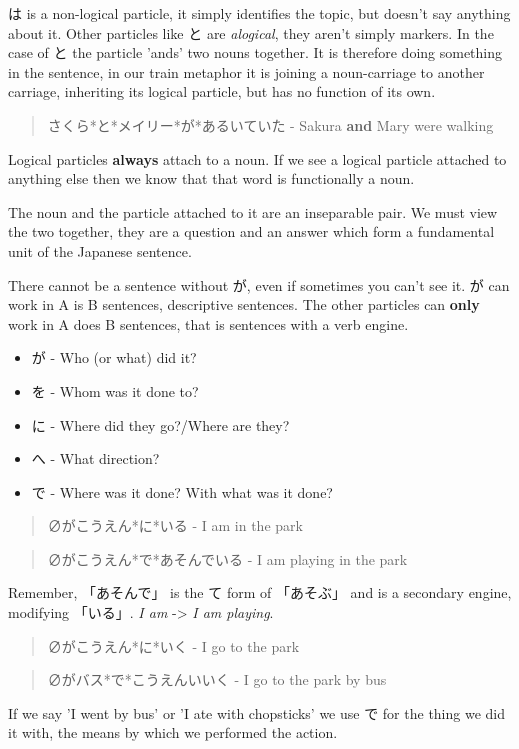 \documentclass[11pt]{article}
\begin{document}
は is a non-logical particle, it simply identifies the topic, but doesn't say anything about it. Other particles like と are \emph{alogical}, they aren't simply markers. In the case of と the particle 'ands' two nouns together. It is therefore doing something in the sentence, in our train metaphor it is joining a noun-carriage to another carriage, inheriting its logical particle, but has no function of its own.
\begin{quote}
さくら*と*メイリー*が*あるいていた - Sakura \textbf{and} Mary were walking
\end{quote}

Logical particles \textbf{always} attach to a noun. If we see a logical particle attached to anything else then we know that that word is functionally a noun.

The noun and the particle attached to it are an inseparable pair. We must view the two together, they are a question and an answer which form a fundamental unit of the Japanese sentence.

There cannot be a sentence without が, even if sometimes you can't see it. が can work in A is B sentences, descriptive sentences. The other particles can \textbf{only} work in A does B sentences, that is sentences with a verb engine.
\begin{itemize}
\item が - Who (or what) did it?
\item を - Whom was it done to?
\item に - Where did they go?/Where are they?
\item へ - What direction?
\item で - Where was it done? With what was it done?
\end{itemize}
\begin{quote}
∅がこうえん*に*いる - I am in the park
\end{quote}
\begin{quote}
∅がこうえん*で*あそんでいる - I am playing in the park
\end{quote}
Remember, 「あそんで」 is the て form of 「あそぶ」 and is a secondary engine, modifying 「いる」. \emph{I am} -> \emph{I am playing}.
\begin{quote}
∅がこうえん*に*いく - I go to the park
\end{quote}
\begin{quote}
∅がバス*で*こうえんいいく - I go to the park by bus
\end{quote}
If we say 'I went by bus' or 'I ate with chopsticks' we use で for the thing we did it with, the means by which we performed the action.
\end{document}
